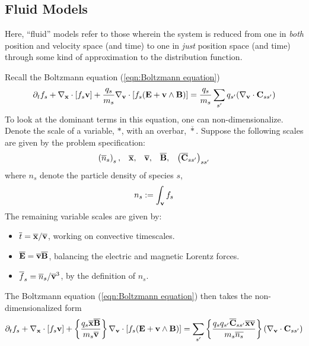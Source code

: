 \subsection*{Fluid Models}
    \noindent\makebox[\linewidth]{\rule{\textwidth}{0.4pt}}
    \begin{definition}
        Here, ``fluid'' models refer to those wherein the system is reduced from one in \emph{both} position and velocity space (and time) to one in \emph{just} position space (and time) through some kind of approximation to the distribution function.
    \end{definition}
    \noindent\makebox[\linewidth]{\rule{\textwidth}{0.4pt}}
    Recall the Boltzmann equation (\ref{eqn:Boltzmann equation})
    \begin{equation*}
        \partial_{t}f_{s} + \nabla_{\mathbf{x}}\cdot[f_{s}\mathbf{v}] + \frac{q_{s}}{m_{s}}\nabla_{\mathbf{v}}\cdot[f_{s}(\mathbf{E} + \mathbf{v}\wedge\mathbf{B})]  =  \frac{q_{s}}{m_{s}}\sum_{s'}q_{s'}(\nabla_{\mathbf{v}}\cdot\mathbf{C}_{ss'})
    \end{equation*}
    To look at the dominant terms in this equation, one can non-dimensionalize. Denote the scale of a variable, $*$, with an overbar, $\overline{*}$. Suppose the following scales are given by the problem specification:
    \begin{align}
        \left(\overline{n}_{s}\right)_{s},  &&
        \overline{\mathbf{x}},  &&
        \overline{\mathbf{v}},  &&
        \overline{\mathbf{B}},  &&
        \left(\overline{\mathbf{C}}_{ss'}\right)_{ss'}
    \end{align}
    where $n_{s}$ denote the particle density of species $s$,
    \begin{equation}
        n_{s}  :=  \int_{\mathbf{v}}f_{s}
    \end{equation}
    The remaining variable scales are given by:
    \begin{itemize}
        \item  $\overline{t}  =  \overline{\mathbf{x}}/\overline{\mathbf{v}}$, working on convective timescales.
        \item  $\overline{\mathbf{E}}  =  \overline{\mathbf{v}}\overline{\mathbf{B}}$, balancing the electric and magnetic Lorentz forces. 
        \item  $\overline{f}_{s}  =  \overline{n}_{s}/\overline{\mathbf{v}}^{3}$, by the definition of $n_{s}$.
    \end{itemize}
    
    The Boltzmann equation (\ref{eqn:Boltzmann equation}) then takes the non-dimensionalized form
    \begin{equation}
        \partial_{t}f_{s} + \nabla_{\mathbf{x}}\cdot[f_{s}\mathbf{v}] + \left\{\frac{q_{s}\overline{\mathbf{x}}\overline{\mathbf{B}}}{m_{s}\overline{\mathbf{v}}}\right\}\nabla_{\mathbf{v}}\cdot[f_{s}(\mathbf{E} + \mathbf{v}\wedge\mathbf{B})]  =  \sum_{s'}\left\{\frac{q_{s}q_{s'}\overline{\mathbf{C}}_{ss'}\overline{\mathbf{x}}\overline{\mathbf{v}}}{m_{s}\overline{n_{s}}}\right\}(\nabla_{\mathbf{v}}\cdot\mathbf{C}_{ss'})
    \end{equation}
    
